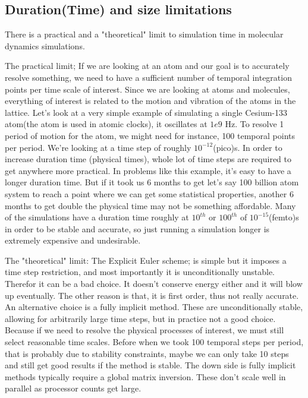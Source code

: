 \documentclass[a4paper]{article}
\begin{document}
\subsection{Duration(Time) and size limitations}
There is a practical and a "theoretical" limit to simulation time in molecular dynamics simulations.

The practical limit; If we are looking at an atom and our goal is to accurately resolve something,  we need to have a sufficient number of temporal integration points per time scale of interest. Since we are looking at atoms and molecules, everything of interest is related to the motion and vibration of the atoms in the lattice.  Let’s look at a very simple example of simulating a single Cesium-133 atom(the atom is used in atomic clocks), it oscillates at $1e9$ Hz. To resolve 1 period of motion for the atom, we might need for instance, 100 temporal points per period.  We're looking at a time step of roughly $10^{-12}$(pico)s. In order to increase duration time (physical times), whole lot of time steps are required to get anywhere more practical. In problems like this example, it's easy to have a longer duration time. But if it took us 6 months to get let’s say 100 billion atom system to reach a point where we can get some statistical properties, another 6 months to get double the physical time may not be something affordable.  Many of the simulations have a duration time roughly at $10^{th}$ or $100^{th}$ of $10^{-15}$(femto)s in order to be stable and accurate, so just running a simulation longer is extremely expensive and undesirable.

The "theoretical" limit:
The Explicit Euler scheme; is simple but it imposes a time step restriction, and most importantly it is unconditionally unstable. Therefor it can be a bad choice. It doesn't conserve energy either and it will blow up eventually. The other reason is that, it is  first order, thus not really accurate. An alternative choice is a fully implicit method. These are unconditionally stable, allowing for arbitrarily large time steps, but in practice not a good choice. Because if we need to resolve the physical processes of interest, we must still select reasonable time scales. Before when we took 100 temporal steps per period, that is probably due to stability constraints, maybe we can only take 10 steps and still get good results if the method is stable. The down side is fully implicit methods typically require a global matrix inversion. These don't scale well in parallel as processor counts get large. 
\end{document}
